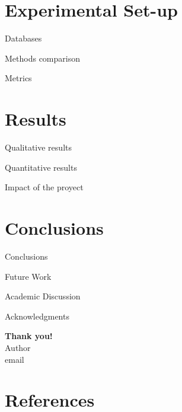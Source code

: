 \documentclass[aspectratio=169]{beamer}
\begin{document}
\section{Experimental Set-up}

\begin{frame}{Databases}
    
\end{frame}


\begin{frame}{Methods comparison}
    
\end{frame}


\begin{frame}{Metrics}
    
\end{frame}


\section{Results}

\begin{frame}{Qualitative results}
    
\end{frame}


\begin{frame}{Quantitative results}
    
\end{frame}


\begin{frame}{Impact of the proyect}
    
\end{frame}

\section{Conclusions}

\begin{frame}{Conclusions}
    
\end{frame}


\begin{frame}{Future Work}
    
\end{frame}


\begin{frame}{Academic Discussion}
    
\end{frame}


\begin{frame}{Acknowledgments}

\begin{center}
	{\Huge{\textbf{\textcolor[rgb]{0.00,0.00,1.00}{Thank you!}}}}\\
	\vspace{0.1cm}
	 Author\\ \scriptsize{email}
\end{center}  


\end{frame}

\section{References}
\end{document}
